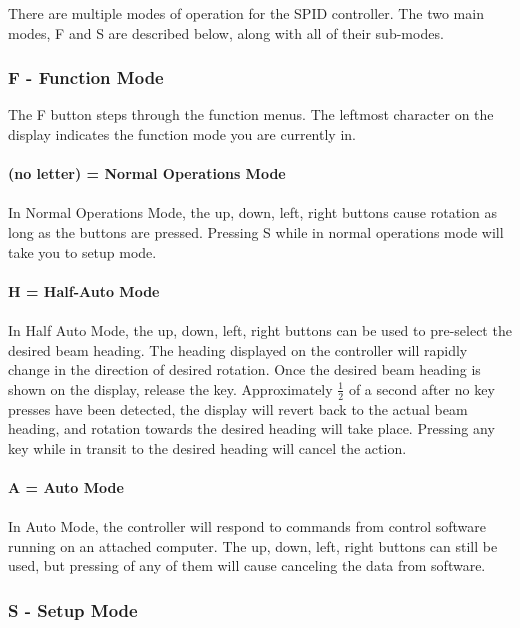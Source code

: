 \documentclass[11pt]{article} %
\begin{document}
There are multiple modes of operation for the SPID controller. The two main modes, F and S are described below, along with all of their sub-modes.

\subsubsection{F - Function Mode}

The F button steps through the function menus. The leftmost character on the display indicates the function mode you are currently in.
\\ \\
\textbf{(no letter) = Normal Operations Mode}
\\ \\
In Normal Operations Mode, the up, down, left, right buttons cause rotation as long as the buttons are pressed. Pressing S while in normal operations mode will take you to setup mode.
\\ \\
\textbf{H = Half-Auto Mode}
\\ \\
In Half Auto Mode, the up, down, left, right buttons can be used to pre-select the desired beam heading. The heading displayed on the controller will rapidly change in the direction of desired rotation. Once the desired beam heading is shown on the display, release the key. Approximately $\frac{1}{2}$ of a second after no key presses have been detected, the display will revert back to the actual beam heading, and rotation towards the desired heading will take place. Pressing any key while in transit to the desired heading will cancel the action.
\\ \\
\textbf{A = Auto Mode}
\\ \\
In Auto Mode, the controller will respond to commands from control software running on an attached computer. The up, down, left, right buttons can still be used, but pressing of any of them will cause canceling the data from software.

\subsubsection{S - Setup Mode}
\end{document}
